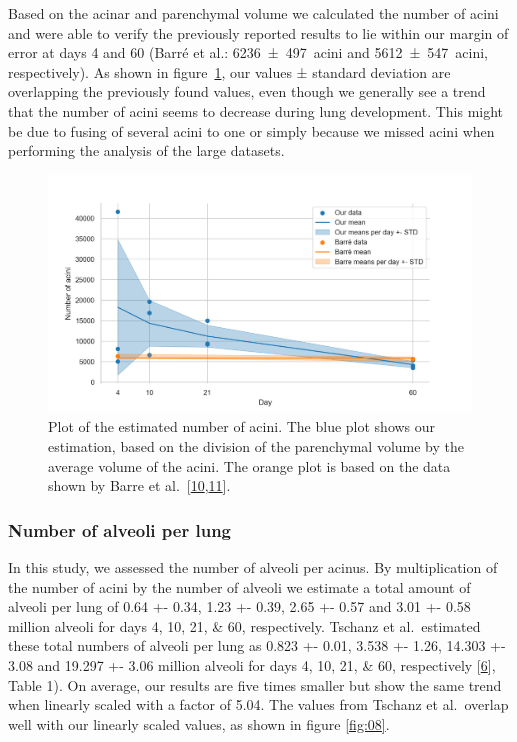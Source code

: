 \documentclass[
  american,
]{article}
\begin{document}
Based on the acinar and parenchymal volume we calculated the number of acini and were able to verify the previously reported results to lie within our margin of error at days 4 and 60 (Barré et al.: 6236~±~497~acini and 5612~±~547~acini, respectively).
As shown in figure~\ref{fig:07}, our values ± standard deviation are overlapping the previously found values, even though we generally see a trend that the number of acini seems to decrease during lung development.
This might be due to fusing of several acini to one or simply because we missed acini when performing the analysis of the large datasets.

\begin{figure}
\hypertarget{fig:07}{%
\centering
\includegraphics{images/fig07.png}
\caption{Plot of the estimated number of acini.
The blue plot shows our estimation, based on the division of the parenchymal volume by the average volume of the acini.
The orange plot is based on the data shown by Barre et al.~{[}\protect\hyperlink{ref-14OP85b2F}{10},\protect\hyperlink{ref-uFNlWogb}{11}{]}.}\label{fig:07}
}
\end{figure}

\hypertarget{number-of-alveoli-per-lung-1}{%
\subsubsection{Number of alveoli per lung}\label{number-of-alveoli-per-lung-1}}

In this study, we assessed the number of alveoli per acinus.
By multiplication of the number of acini by the number of alveoli we estimate a total amount of alveoli per lung of 0.64 +- 0.34, 1.23 +- 0.39, 2.65 +- 0.57 and 3.01 +- 0.58 million alveoli for days 4, 10, 21, \& 60, respectively.
Tschanz et al.~estimated these total numbers of alveoli per lung as 0.823 +- 0.01, 3.538 +- 1.26, 14.303 +- 3.08 and 19.297 +- 3.06 million alveoli for days 4, 10, 21, \& 60, respectively {[}\protect\hyperlink{ref-wnl86DEM}{6}{]}, Table 1).
On average, our results are five times smaller but show the same trend when linearly scaled with a factor of 5.04.
The values from Tschanz et al.~overlap well with our linearly scaled values, as shown in figure \ref{fig:08}.
\end{document}
